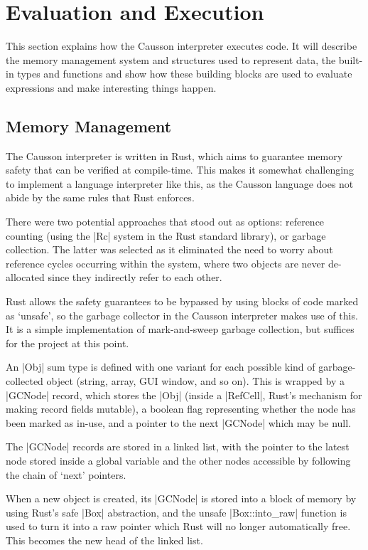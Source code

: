 \documentclass[11pt]{report}
\begin{document}
\section{Evaluation and Execution}

This section explains how the Causson interpreter executes code. It will describe the memory management system and structures used to represent data, the built-in types and functions and show how these building blocks are used to evaluate expressions and make interesting things happen.

\subsection{Memory Management}

The Causson interpreter is written in Rust, which aims to guarantee memory safety that can be verified at compile-time. This makes it somewhat challenging to implement a language interpreter like this, as the Causson language does not abide by the same rules that Rust enforces.

There were two potential approaches that stood out as options: reference counting (using the |Rc| system in the Rust standard library), or garbage collection. The latter was selected as it eliminated the need to worry about reference cycles occurring within the system, where two objects are never de-allocated since they indirectly refer to each other.

Rust allows the safety guarantees to be bypassed by using blocks of code marked as `unsafe', so the garbage collector in the Causson interpreter makes use of this. It is a simple implementation of mark-and-sweep garbage collection, but suffices for the project at this point.

An |Obj| sum type is defined with one variant for each possible kind of garbage-collected object (string, array, GUI window, and so on). This is wrapped by a |GCNode| record, which stores the |Obj| (inside a |RefCell|, Rust's mechanism for making record fields mutable), a boolean flag representing whether the node has been marked as in-use, and a pointer to the next |GCNode| which may be null.

The |GCNode| records are stored in a linked list, with the pointer to the latest node stored inside a global variable and the other nodes accessible by following the chain of `next' pointers.

When a new object is created, its |GCNode| is stored into a block of memory by using Rust's safe |Box| abstraction, and the unsafe |Box::into_raw| function is used to turn it into a raw pointer which Rust will no longer automatically free. This becomes the new head of the linked list.
\end{document}
